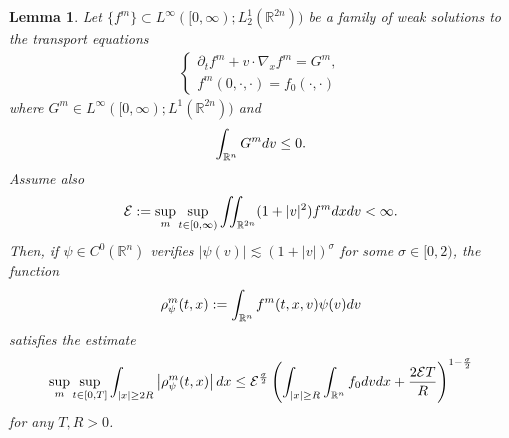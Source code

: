 \documentclass{amsart}
\theoremstyle{plain}
\newtheorem{lemma}[theorem]{Lemma}
\theoremstyle{remark}
\numberwithin{equation}{section}
\newcommand{\p}{\partial}
\newcommand{\R}{\mathbb{R}}
\newcommand{\dx}{\textnormal{d}x}
\newcommand{\dv}{\textnormal{d}v}
\newcommand{\lt}{\left}
\newcommand{\rt}{\right}
\newcommand{\intr}{\int_{\R^n}}
\begin{document}
\begin{lemma}\label{lem:tight}
    Let $\{f^m\} \subset L^\infty([0,\infty);L^1_2(\R^{2n}))$ be a family of weak solutions to the transport equations
    \begin{align}
    \label{eq : transport m}
        \begin{cases}
        \p_t f^m + v\cdot \nabla_x f^m =G^m,\\
        f^m(0,\cdot,\cdot) = f_0(\cdot,\cdot)
        \end{cases}
    \end{align}
    where $G^m \in L^\infty([0,\infty);L^1(\R^{2n}))$ and
    \begin{align}
    \label{eq : collision sign}
        \int_{\R^n} G^m \dv \le 0.
    \end{align}
    Assume also
    \begin{equation*}
        \mathcal{E} := \sup_{m} \sup_{t\in [0,\infty)} \iint_{\R^{2n}} (1+|v|^2)f^m \dx \dv < \infty.
    \end{equation*}
    Then, if $\psi\in C^0(\R^n)$ verifies $|\psi(v)| \lesssim (1+|v|)^\sigma$
    for some $\sigma\in [0,2)$, the function
    \[
    \rho^m_\psi(t,x): = \intr f^m(t,x,v) \psi(v) \dv
    \]
    satisfies the estimate
\[
\sup_{m}\sup_{t \in [0,T]}\int_{|x|\ge 2R} \left|\rho_{\psi}^{m}(t,x)\right| \dx \le \mathcal{E}^{\frac{\sigma}{2}}\lt(\int_{|x|\ge R} \int_{\R^n} f_0 \dv \dx + \frac{2\mathcal{E}T}{R}\rt)^{1-\frac{\sigma}{2}}
\]  
for any $T,R>0$.
\end{lemma}
\end{document}
